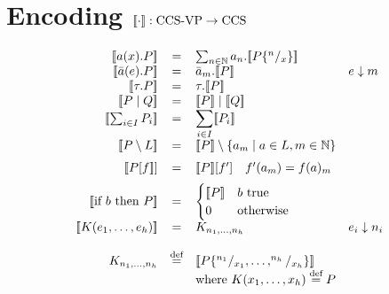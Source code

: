 \section*{Encoding $[\![\cdot]\!] : \text{CCS-VP} \to \text{CCS}$}

\[
    \begin{array}{rcll}
        \enc a(x).P \cne                       & = & \sum_{n \in \N} a_n .  \enc  P\{^n/_x\} \cne                  & \\
        \enc \bar{a}(e).P \cne                 & = & \bar{a}_m .  \enc  P \cne \quad                               & e \downarrow m \\
        \enc \tau.P \cne                       & = & \tau .  \enc P \cne                                           & \\
        \enc P \mid Q \cne                     & = & \enc P \cne  \mid  \enc Q \cne                                & \\
        \enc \sum_{i \in I} P_i \cne           & = & \displaystyle\sum_{i \in I}  \enc P_i \cne                    & \\
        \enc P \setminus L \cne                & = & \enc P \cne  \setminus \{a_m \mid a \in L, m \in \mathbb{N}\} & \\[6pt]
        \enc P[f \cne ]                        & = & \enc P \cne [f'] \quad f'(a_m) = f(a)_m \\[6pt]
        \enc \text{if } b \text{ then } P \cne & = & 
            \begin{cases} 
                \enc P \cne & b \text{ true} \\
                0           & \text{otherwise} 
            \end{cases} \\
        \enc K(e_1,\ldots,e_h) \cne            & = & K_{n_1,\ldots,n_h}                                            & e_i \downarrow n_i \\
        \\
        K_{n_1,\ldots,n_h}                     & \overset{\text{def}}{=} & \enc P\{^{n_1}/_{x_1},\ldots,^{n_h}/_{x_h}\} \cne & \\
                                               & & \text{where } K(x_1,\ldots,x_h) \overset{\text{def}}{=} P         &\\ 
    \end{array}
\]

\newpage